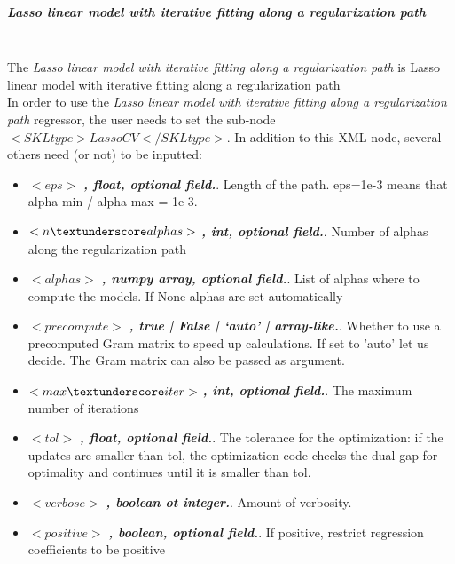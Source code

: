 \subparagraph{Lasso linear model with iterative fitting along a regularization path}
\mbox{}
\\The \textit{Lasso linear model with iterative fitting along a regularization path} is Lasso linear model with iterative fitting along a regularization path
\\In order to use the \textit{Lasso linear model with iterative fitting along a regularization path} regressor, the user needs to set the sub-node $<SKLtype>LassoCV</SKLtype>$.
In addition to this XML node, several others need (or not) to be inputted:
\begin{itemize}
  \item $<eps>$ \textbf{\textit{, float, optional field.}}. Length of the path. eps=1e-3 means that alpha \textunderscore min / alpha \textunderscore max = 1e-3.
  \item $<n \textunderscore alphas>$ \textbf{\textit{, int, optional field.}}. Number of alphas along the regularization path
  \item $<alphas>$ \textbf{\textit{, numpy array, optional field.}}. List of alphas where to compute the models. If None alphas are set automatically
  \item $<precompute>$ \textbf{\textit{, true | False | ‘auto’ | array-like.}}. Whether to use a precomputed Gram matrix to speed up calculations. If set to 'auto' let us decide. The Gram matrix can also be passed as argument.
  \item $<max \textunderscore iter>$ \textbf{\textit{, int, optional field.}}. The maximum number of iterations
  \item $<tol>$ \textbf{\textit{, float, optional field.}}. The tolerance for the optimization: if the updates are smaller than tol, the optimization code checks the dual gap for optimality and continues until it is smaller than tol.
  \item $<verbose>$ \textbf{\textit{, boolean ot integer.}}. Amount of verbosity.
  \item $<positive>$ \textbf{\textit{, boolean, optional field.}}. If positive, restrict regression coefficients to be positive
\end{itemize}

